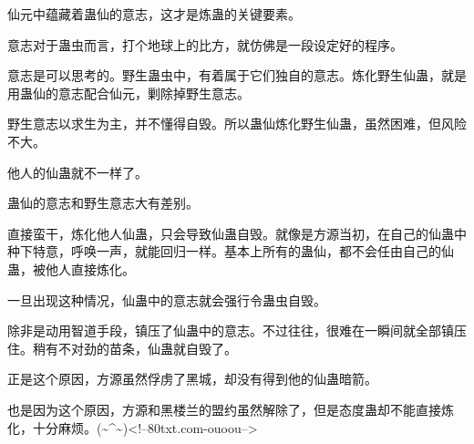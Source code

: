 \begin{this_body}
仙元中蕴藏着蛊仙的意志，这才是炼蛊的关键要素。

意志对于蛊虫而言，打个地球上的比方，就仿佛是一段设定好的程序。

意志是可以思考的。野生蛊虫中，有着属于它们独自的意志。炼化野生仙蛊，就是用蛊仙的意志配合仙元，剿除掉野生意志。

野生意志以求生为主，并不懂得自毁。所以蛊仙炼化野生仙蛊，虽然困难，但风险不大。

他人的仙蛊就不一样了。

蛊仙的意志和野生意志大有差别。

直接蛮干，炼化他人仙蛊，只会导致仙蛊自毁。就像是方源当初，在自己的仙蛊中种下特意，呼唤一声，就能回归一样。基本上所有的蛊仙，都不会任由自己的仙蛊，被他人直接炼化。

一旦出现这种情况，仙蛊中的意志就会强行令蛊虫自毁。

除非是动用智道手段，镇压了仙蛊中的意志。不过往往，很难在一瞬间就全部镇压住。稍有不对劲的苗条，仙蛊就自毁了。

正是这个原因，方源虽然俘虏了黑城，却没有得到他的仙蛊暗箭。

也是因为这个原因，方源和黑楼兰的盟约虽然解除了，但是态度蛊却不能直接炼化，十分麻烦。(\~{}\^{}\~{})<!--80txt.com-ouoou-->

\end{this_body}

